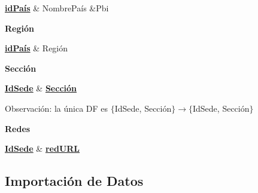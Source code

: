 \documentclass[10pt,a4paper]{article}
\begin{document}
\begin{dependency}
    \raggedright
    \begin{deptext}[TxtBook] %
        \textbf{\underline{idPaís}}  \& NombrePaís \&Pbi \\
    \end{deptext}
\end{dependency} \vspace{0.3cm}

\textbf{Región} 
\vspace{0.1cm}

\begin{dependency}
    \raggedright
    \begin{deptext}[TxtBook] %
        \textbf{\underline{idPaís}} \& Región  \\
    \end{deptext}
\end{dependency} 

\vspace{3mm}
\textbf{Sección} 

\begin{dependency}
    \raggedright
    \begin{deptext}[TxtBook] %
        \textbf{\underline{IdSede}}  \& \textbf{\underline{Sección}}  \\
    \end{deptext}
\end{dependency} \vspace{0.1cm}

Observación: la única DF es $\{$IdSede, Sección$\} \rightarrow \{$IdSede, Sección$\}$

\vspace{3mm}
\textbf{Redes} 

\begin{dependency}
    \raggedright
    \begin{deptext}[TxtBook] %
        \textbf{\underline{IdSede}}  \& \textbf{\underline{redURL}}  \\
    \end{deptext}
\end{dependency} \vspace{0.3cm}

\subsection{Importación de Datos} \vspace{0.3cm}
\end{document}
